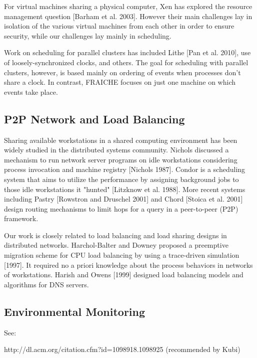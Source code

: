 \documentclass[a4paper]{acm_proc_article-sp}
\begin{document}
For virtual machines sharing a physical computer, Xen has explored the resource management question [Barham et al. 2003].  However their main challenges lay in isolation of the various virtual machines from each other in order to ensure security, while our challenges lay mainly in scheduling.

Work on scheduling for parallel clusters has included Lithe [Pan et al. 2010], use of loosely-synchronized clocks, and others.  The goal for scheduling with parallel clusters, however, is based mainly on ordering of events when processes don't share a clock.  In contrast, FRAICHE focuses on just one machine on which events take place.

\subsection{P2P Network and Load Balancing}

Sharing available workstations in a shared computing environment has been widely studied in the distributed systems community. Nichols discussed a mechanism to run network server programs on idle workstations considering process invocation and machine registry [Nichols 1987]. Condor is a scheduling system that aims to utilize the performance by assigning background jobs to those idle workstations it "hunted" [Litzknow et al. 1988]. More recent systems including Pastry [Rowstron and Druschel 2001] and Chord [Stoica et al. 2001] design routing mechanisms to limit hops for a query in a peer-to-peer (P2P) framework. 

Our work is closely related to load balancing and load sharing designs in distributed networks. Harchol-Balter and Downey proposed a preemptive migration scheme for CPU load balancing by using a trace-driven simulation [1997]. It required no a priori knowledge about the process behaviors in networks of workstations. Harish and Owens [1999] designed load balancing models and algorithms for DNS servers.


\subsection{Environmental Monitoring}
See:

http://dl.acm.org/citation.cfm?id=1098918.1098925
(recommended by Kubi)


\end{document}
